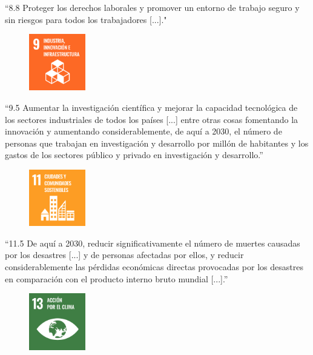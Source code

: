 \documentclass[a4paper, 12pt, spanish, twoside]{article}
\begin{document}
“8.8 Proteger los derechos laborales y promover un entorno de trabajo seguro y sin riesgos para todos los trabajadores [...]."

\clearpage

\newpage
\begin{figure}
    \vspace{-\baselineskip}
    \includegraphics[width=0.22\textwidth]{ods/S-WEB-Goal-09.png}
\end{figure} 

“9.5 Aumentar la investigación científica y mejorar la capacidad tecnológica de los sectores industriales de todos los países [...] entre otras cosas fomentando la innovación y aumentando considerablemente, de aquí a 2030, el número de personas que trabajan en investigación y desarrollo por millón de habitantes y los gastos de los sectores público y privado en investigación y desarrollo.” \hfill\break

\begin{figure}
    \vspace{-\baselineskip}
    \includegraphics[width=0.22\textwidth]{ods/S-WEB-Goal-11.png}
\end{figure} 

“11.5 De aquí a 2030, reducir significativamente el número de muertes causadas por los desastres [...] y de personas afectadas por ellos, y reducir considerablemente las pérdidas económicas directas provocadas por los desastres en comparación con el producto interno bruto mundial [...].” \hfill\break\break

\begin{figure}
    \vspace{-\baselineskip}
    \includegraphics[width=0.22\textwidth]{ods/S-WEB-Goal-13.png}
\end{figure} 
\end{document}
